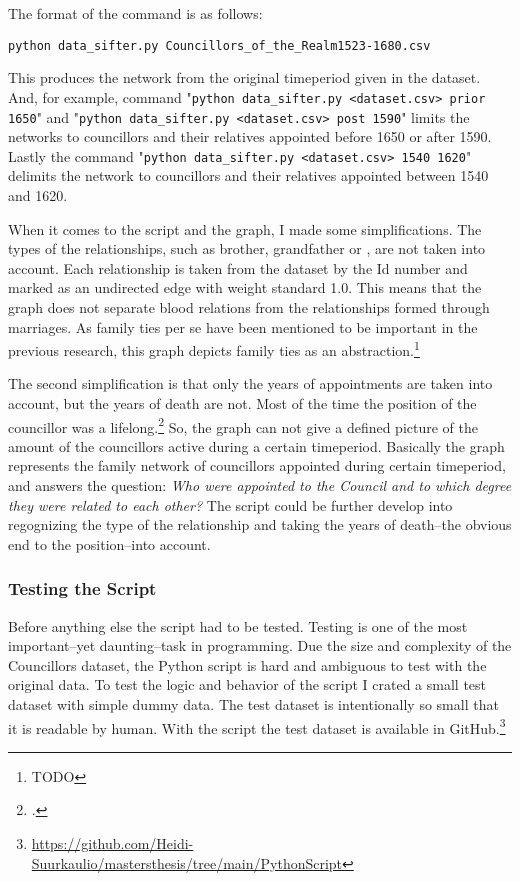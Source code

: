 The format of the command is as follows: 
\begin{verbatim}
python data_sifter.py Councillors_of_the_Realm1523-1680.csv
\end{verbatim}

This produces the network from the original timeperiod given in the dataset. And, for example, command "\texttt{python data\_sifter.py <dataset.csv> prior 1650}" and "\texttt{python data\_sifter.py <dataset.csv> post 1590}" limits the networks to councillors and their relatives appointed before 1650 or after 1590. Lastly the command "\texttt{python data\_sifter.py <dataset.csv> 1540 1620}" delimits the network to councillors and their relatives appointed between 1540 and 1620.

When it comes to the script and the graph, I made some simplifications. The types of the relationships, such as brother, grandfather or , are not taken into account. Each relationship is taken from the dataset by the Id number and marked as an undirected edge with weight standard 1.0. This means that the graph does not separate blood relations from the relationships formed through marriages. As family ties per se have been mentioned to be important in the previous research, this graph depicts family ties as an abstraction.\footnote{TODO} 

The second simplification is that only the years of appointments are taken into account, but the years of death are not. Most of the time the position of the councillor was a lifelong.\footcite[TODO]{HakanenAKoskinen2017} So, the graph can not give a defined picture of the amount of the councillors active during a certain timeperiod. Basically the graph represents the family network of councillors appointed during certain timeperiod, and answers the question: \textit{Who were appointed to the Council and to which degree they were related to each other?} The script could be further develop into regognizing the type of the relationship and taking the years of death–the obvious end to the position–into account.

\subsubsection{Testing the Script}
Before anything else the script had to be tested. Testing is one of the most important–yet daunting–task in programming. Due the size and complexity of the Councillors dataset, the Python script is hard and ambiguous to test with the original data. To test the logic and behavior of the script I crated a small test dataset with simple dummy data. The test dataset is intentionally so small that it is readable by human. With the script the test dataset is available in GitHub.\footnote{\url{https://github.com/Heidi-Suurkaulio/mastersthesis/tree/main/PythonScript}} 

